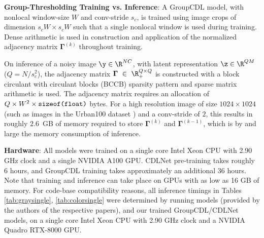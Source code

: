 \documentclass[lettersize,journal]{IEEEtran}
\newcommand{\WINSZ}{W}
\newcommand{\ADJMAT}{\boldsymbol{\Gamma}}
\begin{document}
\textbf{Group-Thresholding Training vs. Inference}:
A GroupCDL model, with nonlocal window-size $\WINSZ$ and conv-stride $s_c$, is
trained using image crops of dimension $s_c \WINSZ \times s_c \WINSZ$ such that a
single nonlocal window is used during training. Dense arithmetic is used in
construction and application of the normalized adjacency matrix $\ADJMAT^{(k)}$
throughout training.

On inference of a noisy image $\y \in \R^{NC}$, with latent representation
$\z \in \R^{QM}$ ($Q=N/s_c^2$), the adjacency matrix $\ADJMAT~\in~\R_+^{Q \times
Q}$ is constructed with a block circulant with circulant blocks (BCCB) sparsity
pattern and sparse matrix arithmetic is used.
The adjacency matrix requires an allocation of 
$Q \times \WINSZ^2 \times \text{\texttt{sizeof(float)}}$ bytes. 
For a high resolution image of size $1024 \times 1024$ (such as images in the
Urban100 dataset \cite{Urban100}) and a conv-stride of $2$, this
results in roughly {$2.6$~GB} of memory required to store $\ADJMAT^{(k)}$ and
$\ADJMAT^{(k-1)}$, which is by and large the memory consumption of inference.

\textbf{Hardware}:
All models were trained on a single core Intel Xeon CPU with 2.90 GHz clock and a single NVIDIA A100 GPU.
CDLNet pre-training takes roughly 6 hours, and GroupCDL training takes
approximately an additional 36 hours. Note that training and inference can take place on GPUs
with as low as 16 GB of memory. For code-base compatibility reasons, all inference timings in Tables
\ref{tab:graysingle}, \ref{tab:colorsingle} 
were determined by running models (provided by the authors of the respective papers), and our trained GroupCDL/CDLNet models, on
a single core Intel Xeon CPU with 2.90 GHz clock and a NVIDIA Quadro RTX-8000
GPU.
\end{document}

